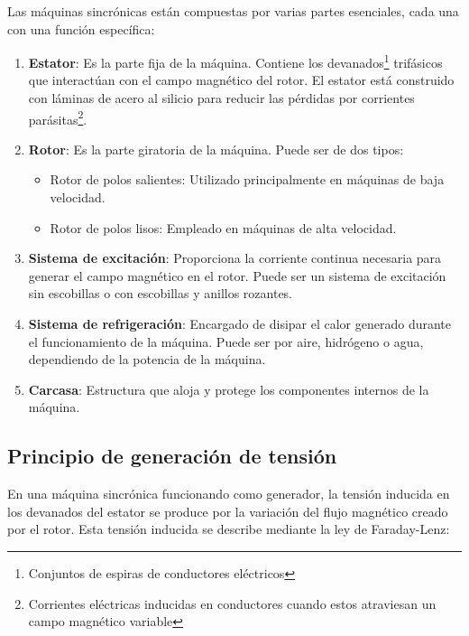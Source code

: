 \documentclass[../main]{subfiles}
\begin{document}
Las máquinas sincrónicas están compuestas por varias partes esenciales, cada una con una función específica:

\begin{enumerate}
    \item \textbf{Estator}: Es la parte fija de la máquina. Contiene los devanados\footnote{Conjuntos de espiras de conductores eléctricos} trifásicos que interactúan con el campo magnético del rotor. El estator está construido con láminas de acero al silicio para reducir las pérdidas por corrientes parásitas\footnote{Corrientes eléctricas inducidas en conductores cuando estos atraviesan un campo magnético variable}.
    
    \item \textbf{Rotor}: Es la parte giratoria de la máquina. Puede ser de dos tipos:
    \begin{itemize}
        \item Rotor de polos salientes: Utilizado principalmente en máquinas de baja velocidad.
        \item Rotor de polos lisos: Empleado en máquinas de alta velocidad.
    \end{itemize}
    
    \item \textbf{Sistema de excitación}: Proporciona la corriente continua necesaria para generar el campo magnético en el rotor. Puede ser un sistema de excitación sin escobillas o con escobillas y anillos rozantes.
    
    \item \textbf{Sistema de refrigeración}: Encargado de disipar el calor generado durante el funcionamiento de la máquina. Puede ser por aire, hidrógeno o agua, dependiendo de la potencia de la máquina.
    
    \item \textbf{Carcasa}: Estructura que aloja y protege los componentes internos de la máquina.
\end{enumerate}

\subsection{Principio de generación de tensión}

En una máquina sincrónica funcionando como generador, la tensión inducida en los devanados del estator se produce por la variación del flujo magnético creado por el rotor. Esta tensión inducida se describe mediante la ley de Faraday-Lenz:
\end{document}

